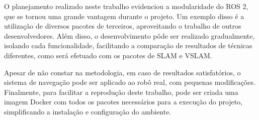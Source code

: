 \documentclass[repeatfields,xlists,xpacks,oneside,yearsonly]{ufrgscca}
\begin{document}
O planejamento realizado neste trabalho evidenciou a modularidade do ROS 2,
que se tornou uma grande vantagem durante o projeto.
Um exemplo disso é a utilização de diversos pacotes de terceiros,
aproveitando o trabalho de outros desenvolvedores.
Além disso, o desenvolvimento pôde ser realizado gradualmente,
isolando cada funcionalidade, facilitando a comparação
de resultados de técnicas diferentes, como será efetuado com os pacotes de SLAM
e VSLAM.

Apesar de não constar na metodologia, em caso de resultados satisfatórios,
o sistema de navegação pode ser aplicado ao robô real, com pequenas
modificações.
Finalmente, para facilitar a reprodução deste trabalho, pode ser
criada uma imagem Docker com todos os pacotes necessários para a execução do
projeto, simplificando a instalação e configuração do ambiente.


\printbibliography

%
%
%
\end{document}
